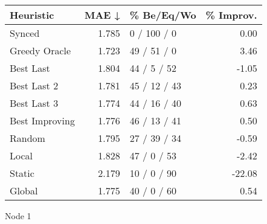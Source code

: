 \begin{tabular}{lrlr}
\toprule
\textbf{Heuristic} & \textbf{MAE ↓} & \textbf{\% Be/Eq/Wo} & \textbf{\% Improv.} \\
\midrule
            Synced &          1.785 &          0 / 100 / 0 &                0.00 \\
     Greedy Oracle &          1.723 &          49 / 51 / 0 &                3.46 \\
         Best Last &          1.804 &          44 / 5 / 52 &               -1.05 \\
       Best Last 2 &          1.781 &         45 / 12 / 43 &                0.23 \\
       Best Last 3 &          1.774 &         44 / 16 / 40 &                0.63 \\
    Best Improving &          1.776 &         46 / 13 / 41 &                0.50 \\
            Random &          1.795 &         27 / 39 / 34 &               -0.59 \\
             Local &          1.828 &          47 / 0 / 53 &               -2.42 \\
            Static &          2.179 &          10 / 0 / 90 &              -22.08 \\
            Global &          1.775 &          40 / 0 / 60 &                0.54 \\
\bottomrule
\end{tabular}
\caption{Node 1}
\label{tab:ds_iid_lr05_le2_bs4_1}

